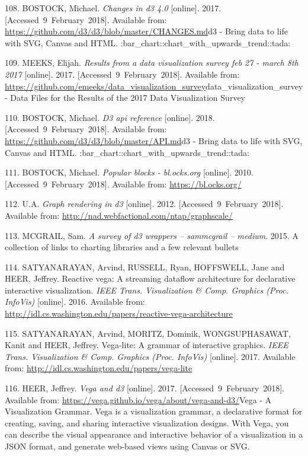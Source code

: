 \documentclass[american,a4paper,oneside,,tablecaptionabove]{scrbook}
\begin{document}
\hypertarget{ref-Bostock.2017}{}
108. BOSTOCK, Michael. \emph{Changes in d3 4.0} {[}online{]}. 2017.
{[}Accessed~9~February~2018{]}. Available from:
\url{https://github.com/d3/d3/blob/master/CHANGES.md}d3 - Bring data to
life with SVG, Canvas and HTML.
:bar\_chart::chart\_with\_upwards\_trend::tada:

\hypertarget{ref-Meeks.2017}{}
109. MEEKS, Elijah. \emph{Results from a data visualization survey feb
27 - march 8th 2017} {[}online{]}. 2017. {[}Accessed~9~February~2018{]}.
Available from:
\url{https://github.com/emeeks/data_visualization_survey}data\_visualization\_survey
- Data Files for the Results of the 2017 Data Visualization Survey

\hypertarget{ref-Bostock.2018}{}
110. BOSTOCK, Michael. \emph{D3 api reference} {[}online{]}. 2018.
{[}Accessed~9~February~2018{]}. Available from:
\url{https://github.com/d3/d3/blob/master/API.md}d3 - Bring data to life
with SVG, Canvas and HTML.
:bar\_chart::chart\_with\_upwards\_trend::tada:

\hypertarget{ref-Bostock.2010}{}
111. BOSTOCK, Michael. \emph{Popular blocks - bl.ocks.org} {[}online{]}.
2010. {[}Accessed~9~February~2018{]}. Available from:
\url{https://bl.ocks.org/}

\hypertarget{ref-UA.2012}{}
112. U.A. \emph{Graph rendering in d3} {[}online{]}. 2012.
{[}Accessed~9~February~2018{]}. Available from:
\url{http://nad.webfactional.com/ntap/graphscale/}

\hypertarget{ref-McGrail.2015}{}
113. MCGRAIL, Sam. \emph{A survey of d3 wrappers -- sammcgrail --
medium}. 2015. A collection of links to charting libraries and a few
relevant bullets

\hypertarget{ref-Satyanarayan.2016}{}
114. SATYANARAYAN, Arvind, RUSSELL, Ryan, HOFFSWELL, Jane and HEER,
Jeffrey. Reactive vega: A streaming dataflow architecture for
declarative interactive visualization. \emph{IEEE Trans. Visualization
\& Comp. Graphics (Proc. InfoVis)} {[}online{]}. 2016. Available from:
\url{http://idl.cs.washington.edu/papers/reactive-vega-architecture}

\hypertarget{ref-Satyanarayan.2017}{}
115. SATYANARAYAN, Arvind, MORITZ, Dominik, WONGSUPHASAWAT, Kanit and
HEER, Jeffrey. Vega-lite: A grammar of interactive graphics. \emph{IEEE
Trans. Visualization \& Comp. Graphics (Proc. InfoVis)} {[}online{]}.
2017. Available from:
\url{http://idl.cs.washington.edu/papers/vega-lite}

\hypertarget{ref-Heer.2017}{}
116. HEER, Jeffrey. \emph{Vega and d3} {[}online{]}. 2017.
{[}Accessed~9~February~2018{]}. Available from:
\url{https://vega.github.io/vega/about/vega-and-d3/}Vega - A
Visualization Grammar. Vega is a visualization grammar, a declarative
format for creating, saving, and sharing interactive visualization
designs. With Vega, you can describe the visual appearance and
interactive behavior of a visualization in a JSON format, and generate
web-based views using Canvas or SVG.
\end{document}
